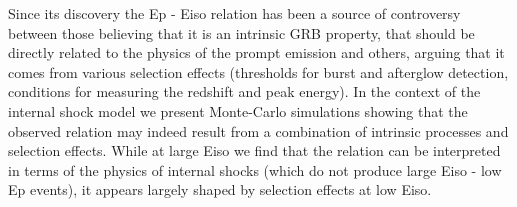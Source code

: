 


\bigskip



\bigskip

\noindent Since its discovery the Ep - Eiso relation has been a source of controversy between those believing that it is an intrinsic GRB property, that should be directly related to the physics of the prompt emission and others, arguing that it comes from various selection effects (thresholds for burst and afterglow detection, conditions for measuring the redshift and peak energy). In the context of the internal shock model we present Monte-Carlo simulations showing that the observed relation may indeed result from a combination of intrinsic processes and selection effects. While at large Eiso we find that the relation can be interpreted in terms of the physics of internal shocks (which do not produce large Eiso - low Ep events), it appears largely shaped by selection effects at low Eiso.

